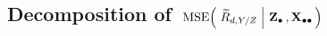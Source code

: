 

\clearpage
\subsection{Decomposition of \,$\textnormal{MSE}\!\left(\,\left.\widetilde{R}_{d,Y/Z}\;\right\vert\,\mathbf{Z}_{\bullet}\,,\mathbf{X}_{\bullet\bullet}\,\right)$}
\setcounter{theorem}{0}


